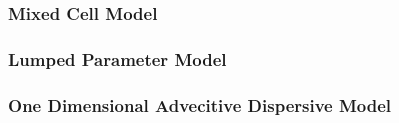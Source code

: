

\subsubsection{Mixed Cell Model}



\subsubsection{Lumped Parameter Model}



\subsubsection{One Dimensional Advecitive Dispersive Model}


